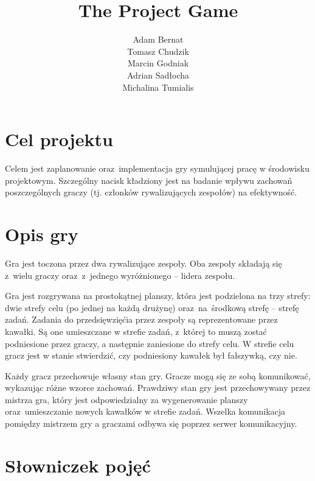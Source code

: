 \documentclass[a4paper]{article}
\title{The Project Game}
\author{
Adam Bernat \\
Tomasz Chudzik \\
Marcin Godniak \\
Adrian Sadłocha \\
Michalina Tumialis
}
\begin{document}
\maketitle
\setcounter{secnumdepth}{2}
\setcounter{tocdepth}{2}
\tableofcontents
\newpage

\listoftodos
\newpage

\section{Cel projektu}

Celem jest zaplanowanie oraz~implementacja gry symulującej pracę w środowisku projektowym.
Szczególny nacisk kładziony jest na badanie wpływu zachowań poszczególnych graczy (tj. członków rywalizujących zespołów) na efektywność.

\section{Opis gry}

Gra jest toczona przez dwa rywalizujące zespoły.
Oba zespoły składają się z~wielu graczy oraz~z~jednego wyróżnionego -- lidera zespołu.

Gra jest rozgrywana na prostokątnej planszy, która jest podzielona na trzy strefy: dwie strefy celu (po jednej na każdą drużynę) oraz~na~środkową strefę -- strefę zadań.
Zadania do przedsięwzięćia przez zespoły są reprezentowane przez kawałki.
Są one umieszczane w strefie zadań, z~której to muszą zostać podniesione przez graczy, a następnie zaniesione do strefy celu.
W strefie celu gracz jest w stanie stwierdzić, czy podniesiony kawałek był fałszywką, czy nie.

Każdy gracz przechowuje własny stan gry.
Gracze mogą się ze sobą komunikować, wykazując różne wzorce zachowań.
Prawdziwy stan gry jest przechowywany przez mistrza gra, który jest odpowiedzialny za wygenerowanie planszy oraz~umieszczanie nowych kawałków w strefie zadań.
Wszelka komunikacja pomiędzy mistrzem gry a graczami odbywa się poprzez serwer komunikacyjny.

\section{Słowniczek pojęć}
\end{document}
